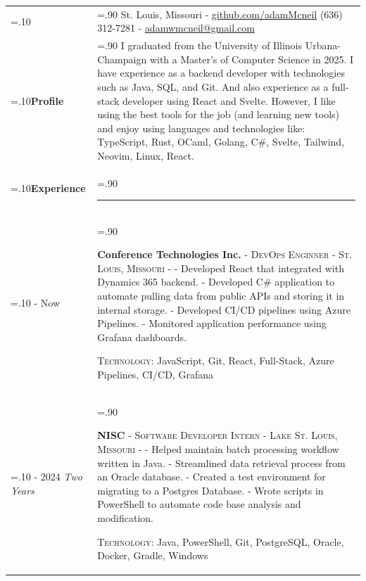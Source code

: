 \documentclass[10pt]{article}
\newcommand{\timeFrame}[3] {
  \if\relax\detokenize{#2}\relax
    #1
  \else
    #1 - #2
  \fi
  \newline
  \scriptsize \textit{#3}
}
\newcommand{\entry}[6] {
  \textbf{#1}
  \if\relax\detokenize{#2}\relax
  \else
       - \textsc{#2}
  \fi
  \if\relax\detokenize{#3}\relax
  \else
      - \textsc{#3}
  \fi
  \if\relax\detokenize{#4}\relax
  \else
      - \href{https://#4}{#4}
  \fi
  \newline #5
  \if\relax\detokenize{#6}\relax
  \else
      \newline \textsc{Technology:} #6
  \fi
  \\
}
\newcommand{\horizontalLine}[0] {
    \noindent\rule{.90\linewidth}{0.4pt}
}
\begin{document}

\begin{tabularx}{\linewidth}{>{\hsize=.10\hsize}X>{\hsize=.90\hsize}X}

{\bfseries\large Adam McNeil} &
St. Louis, Missouri - \href{https://github.com/adamMcneil}{github.com/adamMcneil}\newline
{(636) 312-7281 \hspace{5.5mm} - \href{mailto:adamwmcneil@gmail.com}{adamwmcneil@gmail.com}} \\[5pt]

\textbf{Profile} &
{
  I graduated from the University of Illinois Urbana-Champaign with a Master's of Computer Science in 2025.
  I have experience as a backend developer with technologies such as Java, SQL, and Git.
  And also experience as a full-stack developer using React and Svelte.
  However, I like using the best tools for the job (and learning new tools) and enjoy using languages and technologies like: TypeScript, Rust, OCaml, Golang, C\#, Svelte, Tailwind, Neovim, Linux, React.
} \\

\textbf{Experience} & \horizontalLine \\

\timeFrame{2025}{Now}{} &
  \entry{Conference Technologies Inc.}
  {DevOps Enginner}
  {St. Louis, Missouri}
  {}
  {
  - Developed React that integrated with Dynamics 365 backend. \newline
  - Developed C\# application to automate pulling data from public APIs and storing it in internal storage. \newline
  - Developed CI/CD pipelines using Azure Pipelines. \newline
  - Monitored application performance using Grafana dashboards.
  }
  {JavaScript, Git, React, Full-Stack, Azure Pipelines, CI/CD, Grafana \newline}
\timeFrame{2023}{2024}{Two Years} &
\entry{NISC}
  {Software Developer Intern}
  {Lake St. Louis, Missouri}
  {}
  {
  - Helped maintain batch processing workflow written in Java. \newline
  - Streamlined data retrieval process from an Oracle database. \newline
  - Created a test environment for migrating to a Postgres Database. \newline
  - Wrote scripts in PowerShell to automate code base analysis and modification.
  }
  {Java, PowerShell, Git, PostgreSQL, Oracle, Docker, Gradle, Windows}


\end{tabularx}
\end{document}
